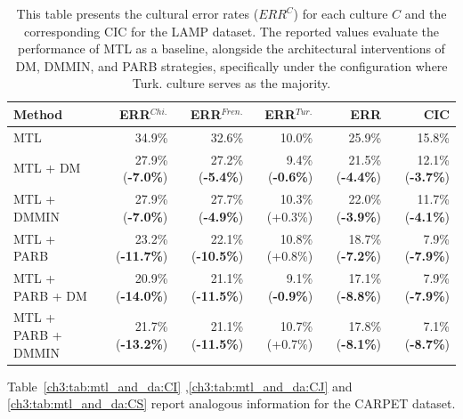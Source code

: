 \begin{table}
\centering
\scriptsize
\begin{tabular}{lrrrrr}
\toprule
\textbf{Method} & \textbf{ERR$^{Chi.}$} & \textbf{ERR$^{Fren.}$} & \textbf{ERR$^{Tur.}$} & \textbf{ERR} & \textbf{CIC} \\
\midrule			
MTL          & 34.9\% & 32.6\% & 10.0\% & 25.9\% & 15.8\% \\
MTL +  DM    & 27.9\% (\textbf{-7.0\%}) & 27.2\% (\textbf{-5.4\%}) & 9.4\% (\textbf{-0.6\%}) & 21.5\% (\textbf{-4.4\%}) & 12.1\% (\textbf{-3.7\%}) \\
MTL +  DMMIN & 27.9\% (\textbf{-7.0\%}) & 27.7\% (\textbf{-4.9\%}) & 10.3\% (+0.3\%) & 22.0\% (\textbf{-3.9\%}) & 11.7\% (\textbf{-4.1\%}) \\
\hline
MTL + PARB     & 23.2\% (\textbf{-11.7\%}) & 22.1\% (\textbf{-10.5\%}) & 10.8\% (+0.8\%) & 18.7\% (\textbf{-7.2\%}) & 7.9\% (\textbf{-7.9\%}) \\
MTL + PARB + DM & 20.9\% (\textbf{-14.0\%}) & 21.1\% (\textbf{-11.5\%}) & 9.1\% (\textbf{-0.9\%}) & 17.1\% (\textbf{-8.8\%}) & 7.9\% (\textbf{-7.9\%}) \\
MTL + PARB + DMMIN & 21.7\% (\textbf{-13.2\%}) & 21.1\% (\textbf{-11.5\%}) & 10.7\% (+0.7\%) & 17.8\% (\textbf{-8.1\%}) & 7.1\% (\textbf{-8.7\%}) \\
\bottomrule
\end{tabular}
\caption{This table presents the cultural error rates ($ERR^C$) for each culture $C$ and the corresponding CIC for the LAMP dataset. The reported values evaluate the performance of MTL as a baseline, alongside the architectural interventions of DM, DMMIN, and PARB strategies, specifically under the configuration where Turk. culture serves as the majority.}
\label{ch3:tab:mtl_and_da:LT}
\end{table}
%
Table~\ref{ch3:tab:mtl_and_da:CI} ,\ref{ch3:tab:mtl_and_da:CJ} and \ref{ch3:tab:mtl_and_da:CS} report analogous information for the CARPET dataset.
%
